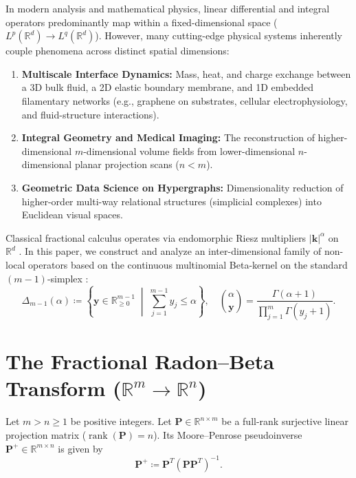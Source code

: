 \documentclass[11pt,a4paper]{article}
\theoremstyle{plain}
\theoremstyle{definition}
\theoremstyle{remark}
\numberwithin{equation}{section}
\begin{document}
In modern analysis and mathematical physics, linear differential and integral operators predominantly map within a fixed-dimensional space ($L^p(\mathbb{R}^d) \to L^q(\mathbb{R}^d)$). However, many cutting-edge physical systems inherently couple phenomena across distinct spatial dimensions:
\begin{enumerate}
    \item \textbf{Multiscale Interface Dynamics:} Mass, heat, and charge exchange between a 3D bulk fluid, a 2D elastic boundary membrane, and 1D embedded filamentary networks (e.g., graphene on substrates, cellular electrophysiology, and fluid-structure interactions).
    \item \textbf{Integral Geometry and Medical Imaging:} The reconstruction of higher-dimensional $m$-dimensional volume fields from lower-dimensional $n$-dimensional planar projection scans ($n < m$).
    \item \textbf{Geometric Data Science on Hypergraphs:} Dimensionality reduction of higher-order multi-way relational structures (simplicial complexes) into Euclidean visual spaces.
\end{enumerate}

Classical fractional calculus operates via endomorphic Riesz multipliers $|\mathbf{k}|^\alpha$ on $\mathbb{R}^d$ \cite{samko1993}. In this paper, we construct and analyze an inter-dimensional family of non-local operators based on the continuous multinomial Beta-kernel on the standard $(m-1)$-simplex \cite{silvafilho2026simplex, silvafilho2026waves}:
\begin{equation}
\Delta_{m-1}(\alpha) \coloneqq \left\{\mathbf{y} \in \mathbb{R}_{\ge 0}^{m-1} \;\middle|\; \sum_{j=1}^{m-1} y_j \le \alpha\right\}, \quad \binom{\alpha}{\mathbf{y}} = \frac{\Gamma(\alpha+1)}{\prod_{j=1}^m \Gamma(y_j+1)}.
\end{equation}

\section{The Fractional Radon--Beta Transform \texorpdfstring{($\mathbb{R}^m \to \mathbb{R}^n$)}{(Rm -> Rn)}}

Let $m > n \ge 1$ be positive integers. Let $\mathbf{P} \in \mathbb{R}^{n \times m}$ be a full-rank surjective linear projection matrix ($\operatorname{rank}(\mathbf{P}) = n$). Its Moore--Penrose pseudoinverse $\mathbf{P}^+ \in \mathbb{R}^{m \times n}$ is given by
\begin{equation}
\mathbf{P}^+ \coloneqq \mathbf{P}^T (\mathbf{P} \mathbf{P}^T)^{-1}.
\end{equation}
\end{document}
